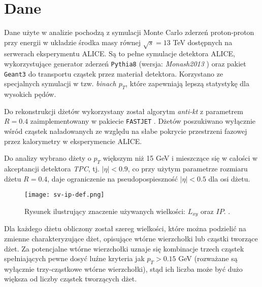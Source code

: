 \section{Dane}
\label{sec:dane}


Dane użyte w analizie pochodzą z symulacji Monte Carlo zderzeń proton-proton przy energii w układzie środka masy równej $\sqrt{s} = 13$ TeV dostępnych na serwerach eksperymentu ALICE.
Są to pełne symulacje detektora ALICE, wykorzystujące generator zderzeń \texttt{Pythia8} \cite{Sjostrand:2007gs} (wersja: \textit{Monash2013} \cite{Skands:2014pea}) oraz pakiet \texttt{Geant3} \cite{Brun:1994aa} do transportu cząstek przez materiał detektora. Korzystano ze specjalnych symulacji w tzw. \textit{binach $p_T$}, które zapewniają lepszą statystykę dla wysokich pędów.

Do rekonstrukcji dżetów wykorzystany został algorytm \textit{anti-kt} z parametrem $R = 0.4$ zaimplementowany w pakiecie \texttt{FASTJET} \cite{Cacciari:2011ma}. Dżetów poszukiwano wyłącznie wśród cząstek naładowanych  ze względu na słabe pokrycie przestrzeni fazowej przez kalorymetry w eksperymencie ALICE.

Do analizy wybrano dżety o $p_T$ większym niż 15 GeV i mieszczące się w całości w akceptancji detektora \textit{TPC}, tj. $|\eta| < 0.9$, co przy użytym parametrze rozmiaru dżetu $R = 0.4$, daje ograniczenie na pseudopospieszność $|\eta| < 0.5$ dla osi dżetu.

\begin{figure}[ht]
	\centering
	\texttt{[image: sv-ip-def.png]}
	\caption{Rysunek ilustrujący znaczenie używanych wielkości: $L_{xy}$ oraz $IP$. .}
	\label{fig:sv-ip-def}
\end{figure}

Dla każdego dżetu obliczony został szereg wielkości, które można podzielić na zmienne charakteryzujące dżet, opisujące wtórne wierzchołki lub cząstki tworzące dżet. 
Za potencjalne wtórne wierzchołki uznaje się kombinacje trzech cząstek spełniających pewne dosyć luźne kryteria jak $p_T > 0.15$ GeV (rozważane są wyłącznie trzy-cząstkowe wtórne wierzchołki), stąd ich liczba może być dużo większa od liczby cząstek tworzących dżet.



